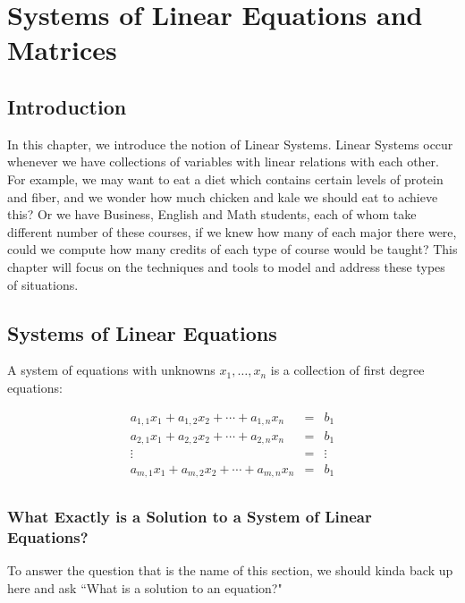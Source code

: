 \chapter{Systems of Linear Equations and Matrices}\label{Chapter:Matrices}


\section*{Introduction}

In this chapter, we introduce the notion of Linear Systems.  Linear Systems occur whenever we have collections of variables with linear relations with each other.  For example, we may want to eat a diet which contains certain levels of protein and fiber, and we wonder how much chicken and kale we should eat to achieve this?  Or we have Business, English and Math students, each of whom take different number of these courses, if we knew how many of each major there were, could we compute how many credits of each type of course would be taught?  This chapter will focus on the techniques and tools to model and address these types of situations.



\section{Systems of Linear  Equations}\label{Section:SystemsofEquations}

A system of equations with unknowns $x_1,\ldots,x_n$ is a collection of first degree equations:

\begin{eqnarray*}
a_{1,1}x_1+a_{1,2}x_2+\cdots+a_{1,n}x_n&=&b_1\\
a_{2,1}x_1+a_{2,2}x_2+\cdots+a_{2,n}x_n&=&b_1\\
\vdots &=&\vdots\\
a_{m,1}x_1+a_{m,2}x_2+\cdots+a_{m,n}x_n&=&b_1\\
\end{eqnarray*}



\subsection{What Exactly is  a Solution to a System of Linear Equations?}

To answer the question that is the name of this section, we should kinda back up here and ask ``What is a solution to an equation?"\\

